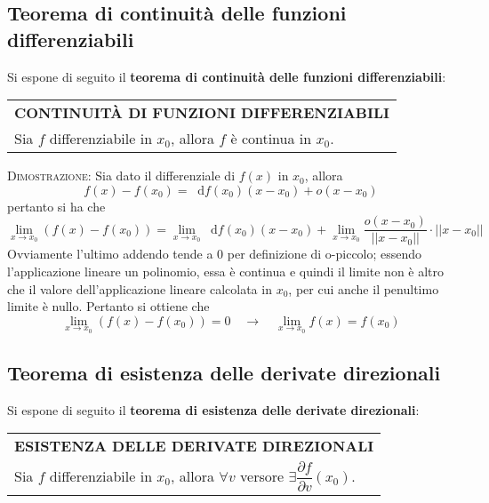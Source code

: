 \documentclass[a4paper]{extarticle}
\renewcommand\arraystretch{}
\newcommand*\dif{\mathop{}\!\mathrm{d}}
\begin{document}
\vspace{1em}
\noindent
\subsection{Teorema di continuità delle funzioni differenziabili}
Si espone di seguito il \textbf{teorema di continuità delle funzioni differenziabili}:

\vspace{1em}
\setlength{\tabcolsep}{14pt}
\renewcommand{\arraystretch}{2}
\noindent
\begin{tabularx}{\textwidth}{@{}|P|@{}}
    \hline
    {\textbf{CONTINUITÀ DI FUNZIONI DIFFERENZIABILI}}\\
    \parbox{\linewidth}{Sia $f$ differenziabile in $x_0$, allora $f$ è continua in $x_0$.\vspace{3mm}}\\
    \hline
\end{tabularx}

\vspace{2em}
\noindent
\normalfont \normalsize
\textsc{Dimostrazione}: Sia dato il differenziale di $f(x)$ in $x_0$, allora
\[f(x)-f(x_0) = \dif f(x_0)(x-x_0)+o(x-x_0)\]
pertanto si ha che 
\[\lim_{x \to x_0} \left(f(x)-f(x_0)\right) = \lim_{x \to x_0} \dif f(x_0)(x-x_0) + \lim_{x \to x_0} \frac{o(x-x_0)}{\left\vert\left\vert x-x_0 \right\vert\right\vert} \cdot {\left\vert\left\vert x-x_0 \right\vert\right\vert}\]
Ovviamente l'ultimo addendo tende a $0$ per definizione di o-piccolo; essendo l'applicazione lineare un polinomio, essa è continua e quindi il limite non è altro che il valore dell'applicazione lineare calcolata in $x_0$, per cui anche il penultimo limite è nullo. Pertanto si ottiene che
\[\lim_{x \to x_0} \left(f(x)-f(x_0)\right) = 0 \hspace{1em} \rightarrow \hspace{1em} \lim_{x \to x_0} f(x) = f(x_0)\]

\vspace{1em}
\noindent
\subsection{Teorema di esistenza delle derivate direzionali}
Si espone di seguito il \textbf{teorema di esistenza delle derivate direzionali}:

\vspace{1em}
\setlength{\tabcolsep}{14pt}
\renewcommand{\arraystretch}{2}
\noindent
\begin{tabularx}{\textwidth}{@{}|P|@{}}
    \hline
    {\textbf{ESISTENZA DELLE DERIVATE DIREZIONALI}}\\
    \parbox{\linewidth}{Sia $f$ differenziabile in $x_0$, allora $\forall v$ versore $\exists \dfrac{\partial f}{\partial v}(x_0)$.
    \vspace{1mm}}\\
    \hline
\end{tabularx}
\end{document}
